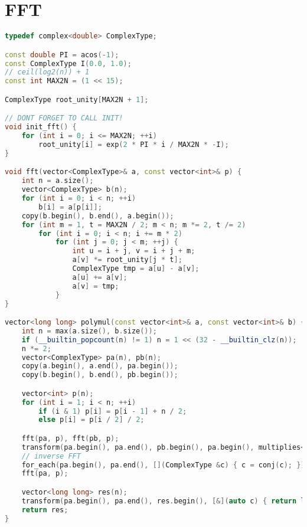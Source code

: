 \documentclass[A4 paper, 12pt]{article}
\begin{document}
	\section{FFT}
	\begin{lstlisting}[language=C++]
typedef complex<double> ComplexType;

const double PI = acos(-1);
const ComplexType I(0.0, 1.0);
// ceil(log2(n)) + 1
const int MAX2N = (1 << 15);

ComplexType root_unity[MAX2N + 1];

// DONT FORGET TO CALL INIT!
void init_fft() {
    for (int i = 0; i <= MAX2N; ++i)
        root_unity[i] = exp(2 * PI * i / MAX2N * -I);
}

void fft(vector<ComplexType>& a, const vector<int>& p) {
    int n = a.size();
    vector<ComplexType> b(n);
    for (int i = 0; i < n; ++i)
        b[i] = a[p[i]];
    copy(b.begin(), b.end(), a.begin());
    for (int m = 1, t = MAX2N / 2; m < n; m *= 2, t /= 2)
        for (int i = 0; i < n; i += m * 2)
            for (int j = 0; j < m; ++j) {
                int u = i + j, v = i + j + m;
                a[v] *= root_unity[j * t];
                ComplexType tmp = a[u] - a[v];
                a[u] += a[v];
                a[v] = tmp;
            }
}

vector<long long> polymul(const vector<int>& a, const vector<int>& b) {
    int n = max(a.size(), b.size());
    if (__builtin_popcount(n) != 1) n = 1 << (32 - __builtin_clz(n));
    n *= 2;
    vector<ComplexType> pa(n), pb(n);
    copy(a.begin(), a.end(), pa.begin());
    copy(b.begin(), b.end(), pb.begin());

    vector<int> p(n);
    for (int i = 1; i < n; ++i)
        if (i & 1) p[i] = p[i - 1] + n / 2;
        else p[i] = p[i / 2] / 2;

    fft(pa, p), fft(pb, p);
    transform(pa.begin(), pa.end(), pb.begin(), pa.begin(), multiplies<ComplexType>());
    // inverse FFT
    for_each(pa.begin(), pa.end(), [](ComplexType &c) { c = conj(c); });
    fft(pa, p);

    vector<long long> res(n);
    transform(pa.begin(), pa.end(), res.begin(), [&](auto c) { return lround(c.real() / n); });
    return res;
}
\end{lstlisting}
\end{document}

